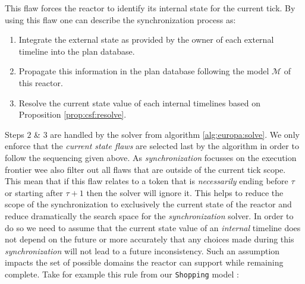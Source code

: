 This flaw forces the reactor to identify its internal state
for the current tick. By using this flaw one can describe the
synchronization process as:

\begin{enumerate}
\item Integrate the external state as provided by the owner of each
  external timeline into the plan database.
\item Propagate this information in the plan database following the
  model $\mathcal{M}$ of this reactor.
\item Resolve the current state value of each internal timelines based
  on Proposition \ref{prop:csf:resolve}.
\end{enumerate}


Steps $2$ \& $3$ are handled by the \eu solver from algorithm
\ref{alg:europa:solve}. We only enforce that the {\em current state
  flaws} are selected last by the algorithm in order to follow the
sequencing given above. As {\em synchronization} focusses on the
execution frontier wee also filter out all flaws that are outside of
the current tick scope. This mean that if this flaw relates to a token
that is {\em necessarily} ending before $\tau$ or starting after
$\tau+1$ then the solver will ignore it. This helps to reduce the
scope of the synchronization to exclusively the current state of the
reactor and reduce dramatically the search space for the {\em
  synchronization} solver. In order to do so we need to assume 
that the current state value of an {\em internal} timeline does not 
depend on the future or more accurately that any choices made during 
this {\em synchronization} will not lead to a future inconsistency. 
Such an assumption impacts the set of possible domains the reactor 
can support while remaining complete. Take for  example this rule from 
our \texttt{Shopping} model :

